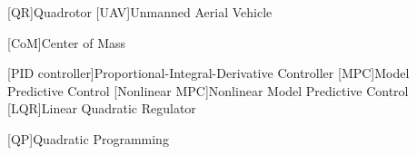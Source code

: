 
\begin{acronym}[\hspace{0.8in}] %


%	

%
%
%	

%	
%	
%
%	
%
%	
%	
%	

	[QR]{Quadrotor}
	[UAV]{Unmanned Aerial Vehicle}

	[CoM]{Center of Mass}
	
	[PID controller]{Proportional-Integral-Derivative Controller}
	[MPC]{Model Predictive Control}
	[Nonlinear MPC]{Nonlinear Model Predictive Control}
	[LQR]{Linear Quadratic Regulator}
	
	[QP]{Quadratic Programming}


\end{acronym}